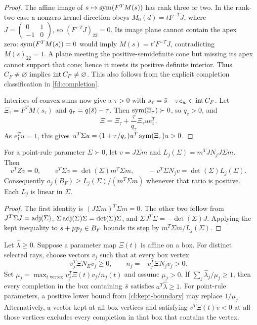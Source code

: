 \begin{proof}
The affine image of $s\mapsto\operatorname{sym}(F^TM(s))$ has rank three or two.
In the rank-two case a nonzero kernel direction obeys
$M_0(d)=tF^{-T}J$, where $J=\left(\begin{smallmatrix}0&1\\-1&0\end{smallmatrix}\right)$,
so $(F^{-T}J)_{22}=0$. Its image plane cannot contain the apex zero:
$\operatorname{sym}(F^TM(s))=0$ would imply $M(s)=t'F^{-T}J$, contradicting
$M(s)_{22}=1$. A plane meeting the positive-semidefinite cone but missing
its apex cannot support that cone; hence it meets its positive definite
interior. Thus $C_F\ne\varnothing$ implies $\operatorname{int} C_F\ne\varnothing$.
This also follows from the explicit completion classification in
\cref{fd:completion}.

Interiors of convex sums now give a $\tau>0$ with
$s_\tau=\bar s-\tau e_w\in\operatorname{int} C_F$.
Let $\Xi_\tau=F^TM(s_\tau)$ and $q_\tau=q(\bar s)-\tau$.
Then $\operatorname{sym}(\Xi_\tau)\succ0$, so $q_\tau>0$, and
\[
 \Xi=\Xi_\tau+\frac{\tau}{q_\tau}\Xi_\tau u e_1^T.
\]
As $e_1^Tu=1$, this gives
$u^T\Sigma u=(1+\tau/q_\tau)u^T\operatorname{sym}(\Xi_\tau)u>0$.
\end{proof}

\begin{lemma}\label{cl:kept-boundary}
For a point-rule parameter $\Sigma\succ0$, let $v=J\Sigma m$ and
$L_j(\Sigma)=m^TJN_jJ\Sigma m$. Then
\[
 v^TZv=0,\qquad
 v^T\Sigma v=\det(\Sigma)m^T\Sigma m,\qquad
 -v^T\Sigma N_jv=\det(\Sigma)L_j(\Sigma).
\]
Consequently $a_j(B_F)\ge L_j(\Sigma)/(m^T\Sigma m)$ whenever that ratio
is positive. Each $L_j$ is linear in $\Sigma$.
\end{lemma}

\begin{proof}
The first identity is $(J\Sigma m)^T\Sigma m=0$.
The other two follow from
$J^T\Sigma J=\operatorname{adj}(\Sigma)$,
$\Sigma\operatorname{adj}(\Sigma)\Sigma=\det(\Sigma)\Sigma$, and
$\Sigma J^T\Sigma=-\det(\Sigma)J$.
Applying the kept inequality to $\bar s+\mu p_j\in B_F$ bounds its step
by $m^T\Sigma m/L_j(\Sigma)$.
\end{proof}

\begin{lemma}\label{cl:box-certificate}
Let $\widehat\lambda\ge0$. Suppose a parameter map $\Xi(t)$ is affine
on a box. For distinct selected rays, choose vectors $v_j$ such that at
every box vertex
\[
 v_j^T\Xi N_Ev_j\ge0,\qquad
 n_j=-v_j^T\Xi N_jv_j>0.
\]
Set $\mu_j=\max_{t\text{ vertex}}v_j^T\Xi(t)v_j/n_j(t)$ and assume
$\mu_j>0$. If $\sum_j\widehat\lambda_j/\mu_j\ge1$, then every completion
in the box containing $\bar s$ satisfies
$a^T\widehat\lambda\ge1$.
For point-rule parameters, a positive lower bound from
\cref{cl:kept-boundary} may replace $1/\mu_j$.
Alternatively, a vector kept at all box vertices and satisfying
$v^T\Xi(t)v<0$ at all those vertices excludes every completion in that
box that contains the vertex.
\end{lemma}

